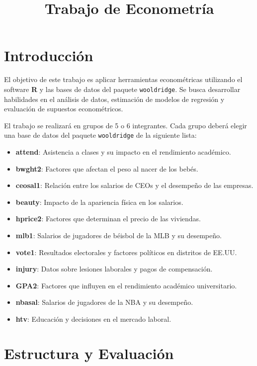 \documentclass[a4paper,12pt]{article}
\title{Trabajo de Econometría}
\date{}
\begin{document}
\maketitle

\section{Introducción}

El objetivo de este trabajo es aplicar herramientas econométricas utilizando el software \textbf{R} y las bases de datos del paquete \texttt{wooldridge}. Se busca desarrollar habilidades en el análisis de datos, estimación de modelos de regresión y evaluación de supuestos econométricos.

El trabajo se realizará en grupos de 5 o 6 integrantes. Cada grupo deberá elegir una base de datos del paquete \texttt{wooldridge} de la siguiente lista:

\begin{itemize}
    \item \textbf{attend}: Asistencia a clases y su impacto en el rendimiento académico.
    \item \textbf{bwght2}: Factores que afectan el peso al nacer de los bebés.
    \item \textbf{ceosal1}: Relación entre los salarios de CEOs y el desempeño de las empresas.
    \item \textbf{beauty}: Impacto de la apariencia física en los salarios.
    \item \textbf{hprice2}: Factores que determinan el precio de las viviendas.
    \item \textbf{mlb1}: Salarios de jugadores de béisbol de la MLB y su desempeño.
    \item \textbf{vote1}: Resultados electorales y factores políticos en distritos de EE.UU.
    \item \textbf{injury}: Datos sobre lesiones laborales y pagos de compensación.
    \item \textbf{GPA2}: Factores que influyen en el rendimiento académico universitario.
    \item \textbf{nbasal}: Salarios de jugadores de la NBA y su desempeño.
    \item \textbf{htv}: Educación y decisiones en el mercado laboral.
\end{itemize}

\section{Estructura y Evaluación}
\end{document}

